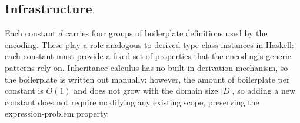 \subsection{Infrastructure}

Each constant $d$ carries four groups of boilerplate
definitions used by the encoding.
These play a role analogous to derived type-class instances
in Haskell: each constant must provide a fixed set of
properties that the encoding's generic patterns rely on.
Inheritance-calculus has no built-in derivation mechanism,
so the boilerplate is written out manually; however, the
amount of boilerplate per constant is $O(1)$
and does not grow with the domain size $|D|$,
so adding a new constant
does not require modifying any existing scope, preserving
the expression-problem property.


